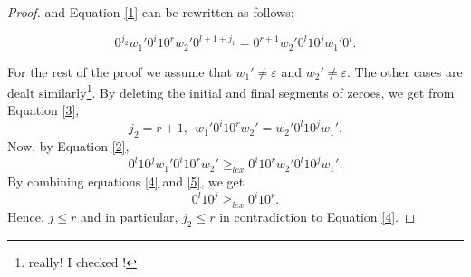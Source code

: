 \documentclass{article}
\theoremstyle{definition}
\begin{document}
\begin{proof}
	and Equation \ref{1} can be rewritten as follows:
	
	\begin{equation}
	\label{3}
	0^{j_2}w_1'0^i10^rw_2'0^{l+1+j_1}=0^{r+1}w_2'0^l10^jw_1'0^i.
	\end{equation}
	
	For the rest of the proof we assume that $w_1'\neq\varepsilon$ and $w_2'\neq \varepsilon$. The other cases are dealt similarly\footnote{really! I checked !}.
	By deleting the initial and final segments of zeroes, we get from Equation \ref{3},
	\begin{equation}
	\label{4}
	j_2=r+1, \ \ w_1'0^i10^rw_2'=w_2'0^l10^jw_1'.
	\end{equation}
	Now, by Equation \ref{2}, 
	\begin{equation}
	\label{5}
	0^l10^jw_1'0^i10^rw_2'\geq_{lex} 0^i10^rw_2'0^l10^{j}w_1'.
	\end{equation}
	By combining equations \ref{4} and \ref{5}, we get 
	\begin{equation}
	0^l10^j\geq_{lex}0^i10^r.
	\end{equation}
	Hence, $j\leq r$ and in particular, $j_2\leq r$ in contradiction to Equation \ref{4}.
\end{proof}
\end{document}

